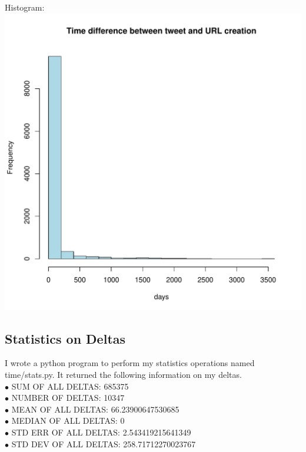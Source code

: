 \documentclass[12pt]{report}
\begin{document}
Histogram:\\
\includegraphics{timedif.pdf}

\subsection*{Statistics on Deltas}
I wrote a python program to perform my statistics operations named time/stats.py.  It returned the following information on my deltas.\\
$\bullet$ SUM OF ALL DELTAS:  685375\\
$\bullet$ NUMBER OF DELTAS:  10347\\
$\bullet$ MEAN OF ALL DELTAS:  66.23900647530685\\
$\bullet$ MEDIAN OF ALL DELTAS:  0\\
$\bullet$ STD ERR OF ALL DELTAS:  2.543419215641349\\
$\bullet$ STD DEV OF ALL DELTAS:  258.71712270023767\\
\end{document}
